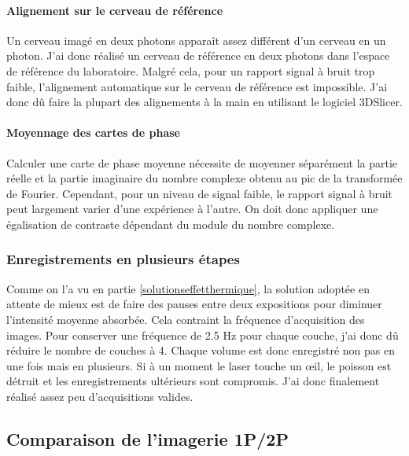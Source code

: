 \paragraph{Alignement sur le cerveau de référence}
Un cerveau imagé en deux photons apparaît assez différent d'un cerveau en un photon. J'ai donc réalisé un cerveau de référence en deux photons dans l'espace de référence du laboratoire. Malgré cela, pour un rapport signal à bruit trop faible, l'alignement automatique sur le cerveau de référence est impossible. J'ai donc dû faire la plupart des alignements à la main en utilisant le logiciel 3DSlicer.
\paragraph{Moyennage des cartes de phase}
Calculer une carte de phase moyenne nécessite de moyenner séparément la partie réelle et la partie imaginaire du nombre complexe obtenu au pic de la transformée de Fourier. Cependant, pour un niveau de signal faible, le rapport signal à bruit peut largement varier d'une expérience à l'autre. On doit donc appliquer une égalisation de contraste dépendant du module du nombre complexe.

\subsubsection{Enregistrements en plusieurs étapes}
Comme on l'a vu en partie \ref{solutionseffetthermique}, la solution adoptée en attente de mieux est de faire des pauses entre deux expositions pour diminuer l'intensité moyenne absorbée. Cela contraint la fréquence d'acquisition des images. Pour conserver une fréquence de 2.5 Hz pour chaque couche, j'ai donc dû réduire le nombre de couches à 4. Chaque volume est donc enregistré non pas en une fois mais en plusieurs. Si à un moment le laser touche un œil, le poisson est détruit et les enregistrements ultérieurs sont compromis. J'ai donc finalement réalisé assez peu d'acquisitions valides.

\subsection{Comparaison de l'imagerie 1P/2P}

